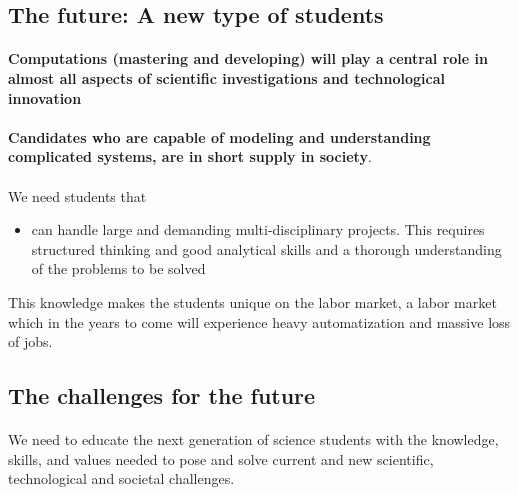 \documentclass[%
twoside,                 %
final,                   %
10pt]{article}
\begin{document}
\subsection*{The future: A new type of students}


\paragraph{}
\textbf{Computations (mastering and developing)  will play a central role in almost all aspects of scientific investigations and technological innovation}




\paragraph{}
\textbf{Candidates who are capable of modeling and understanding complicated
systems, are in short supply in society}.



\paragraph{}
We need students that  
\begin{itemize}
\item can handle large and demanding multi-disciplinary  projects. This requires structured thinking and good analytical skills and a thorough understanding of the problems to be solved 
\end{itemize}

\noindent
This knowledge makes the students unique on the labor market, a labor market which in the years to come will experience heavy automatization and massive loss of jobs.






\subsection*{The challenges for the future}

\paragraph{}
We need to educate the next generation of 
science students with the knowledge, skills, and values needed to pose
and solve current and new scientific, technological and societal
challenges.
\end{document}
